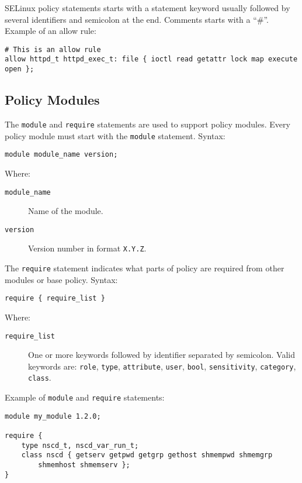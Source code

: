 SELinux policy statements starts with a statement keyword usually followed by
several identifiers and semicolon at the end. Comments starts with a ``\#''.
Example of an allow rule:

\begin{lstlisting}
# This is an allow rule
allow httpd_t httpd_exec_t: file { ioctl read getattr lock map execute open };
\end{lstlisting}

\subsection{Policy Modules}
\label{modules}

The \texttt{module} and \texttt{require} statements are used to support policy
modules. Every policy module must start with the \texttt{module} statement.
Syntax:
\begin{lstlisting}
module module_name version;
\end{lstlisting}
Where:
\begin{description}
    \item [\texttt{module\_name}] Name of the module.
    \item [\texttt{version}] Version number in format \texttt{X.Y.Z}.
\end{description}

The \texttt{require} statement indicates what parts of policy are required from
other modules or base policy. Syntax:
\begin{lstlisting}
require { require_list }
\end{lstlisting}
Where:
\begin{description}
    \item [\texttt{require\_list}] One or more keywords followed by identifier
        separated by semicolon. Valid keywords are: \texttt{role},
        \texttt{type}, \texttt{attribute}, \texttt{user}, \texttt{bool},
        \texttt{sensitivity}, \texttt{category}, \texttt{class}.
\end{description}

Example of \texttt{module} and \texttt{require} statements:
\begin{lstlisting}
module my_module 1.2.0;

require {
    type nscd_t, nscd_var_run_t;
    class nscd { getserv getpwd getgrp gethost shmempwd shmemgrp
        shmemhost shmemserv };
}
\end{lstlisting}

